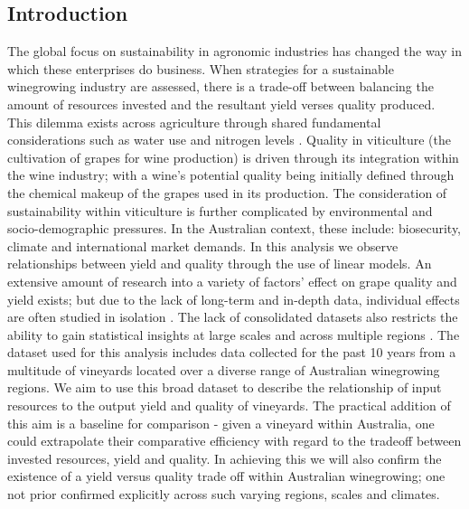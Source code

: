 \documentclass[review,12pt,authoryear]{elsarticle}
\begin{document}
\begin{linenumbers}
\section{Introduction}
The global focus on sustainability in agronomic industries has changed the way in which these enterprises do business. When strategies for a sustainable winegrowing industry are assessed, there is a trade-off between balancing the amount of resources invested and the resultant yield verses quality produced. This dilemma exists across agriculture through shared fundamental considerations such as water use and nitrogen levels \citep{hemmingCherryTomatoProduction2020,kawasakiQualityMattersMore2016, zhuEffectsNitrogenLevel2017}. Quality in viticulture (the cultivation of grapes for wine production) is driven through its integration within the wine industry; with a wine's potential quality being initially defined through the chemical makeup of the grapes used in its production. The consideration of sustainability within viticulture is further complicated by environmental and socio-demographic pressures. In the Australian context, these include: biosecurity, climate and international market demands.
\newline
In this analysis we observe relationships between yield and quality through the use of linear models. An extensive amount of research into a variety of factors' effect on grape quality and yield exists; but due to the lack of long-term and in-depth data, individual effects are often studied in isolation \citep{abbalDecisionSupportSystem2016}. The lack of consolidated datasets also restricts the ability to gain statistical insights at large scales and across multiple regions \citep{keithjonesAustralianWineIndustry2002,knightFirmResourcesDevelopment2019}. The dataset used for this analysis includes data collected for the past 10 years from a multitude of vineyards located over a diverse range of Australian winegrowing regions.
\newline
We aim to use this broad dataset to describe the relationship of input resources to the output yield and quality of vineyards. The practical addition of this aim is a baseline for comparison - given a vineyard within Australia, one could extrapolate their comparative efficiency with regard to the tradeoff between invested resources, yield and quality. In achieving this we will also confirm the existence of a yield versus quality trade off within Australian winegrowing; one not prior confirmed explicitly across such varying regions, scales and climates. 

\end{linenumbers}
\end{document}
